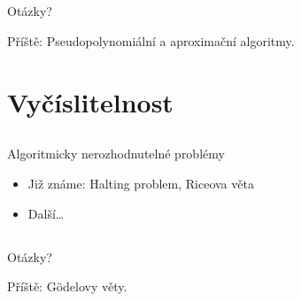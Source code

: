 \documentclass{beamer}
\begin{document}
\subsection{}
\begin{frame}{Otázky?}
\begin{center}
Příště: Pseudopolynomiální a aproximační algoritmy.
\end{center}
\end{frame}

\section{Vyčíslitelnost}

\subsection{}
\begin{frame}{Algoritmicky nerozhodnutelné problémy}
\begin{itemize}
\item Již známe: Halting problem, Riceova věta
\item Další\dots
\end{itemize}
\end{frame}

\subsection{}
\begin{frame}{Otázky?}
\begin{center}
Příště: Gödelovy věty.
\end{center}
\end{frame}

\subsection{}
\end{document}
